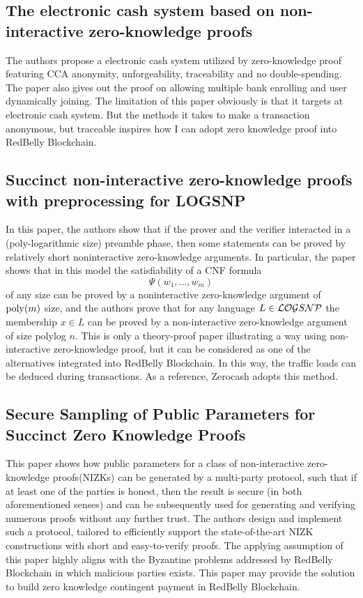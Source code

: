 \subsection{The electronic cash system based on non-interactive zero-knowledge proofs\cite{doi:10.1080/00207160.2014.933816}}

The authors propose a electronic cash system utilized by zero-knowledge proof featuring CCA anonymity, 
unforgeability, traceability and no double-spending. The paper also gives out the proof on allowing multiple
bank enrolling and user dynamically joining. The limitation of this paper obviously is that it targets at 
electronic cash system. But the methods it takes to make a transaction anonymous, but traceable inspires how
I can adopt zero knowledge proof into RedBelly Blockchain.

\subsection{Succinct non-interactive zero-knowledge proofs with preprocessing for LOGSNP\cite{kalai2006succinct}}

In this paper, the authors show that if the prover and the verifier interacted in a (poly-logarithmic size) 
preamble phase, then some statements can be proved by relatively short noninteractive 
zero-knowledge arguments. In particular, the paper shows that in this model the satisfiability of a CNF 
formula $$\Psi(w_{1}, \ldots, w_{m})$$ of any size can be proved by a noninteractive zero-knowledge 
argument of ${\rm poly}(m)$ size, and the authors prove that for any language $L\in {\cal LOG}S{\cal NP}$
the membership $x\in L$ can be proved by a non-interactive zero-knowledge argument of size polylog $n$.
This is only a theory-proof paper illustrating a way using non-interactive zero-knowledge proof, but it can
be considered as one of the alternatives integrated into RedBelly Blockchain. In this way, the traffic loads
can be deduced during transactions. As a reference, Zerocash adopts this method.

\subsection{Secure Sampling of Public Parameters for Succinct Zero Knowledge Proofs\cite{ben2015secure}}

This paper shows how public parameters for a class of non-interactive zero-knowledge proofs(NIZKs)
can be generated by a multi-party protocol, such that if at least one of the parties is honest, 
then the result is secure (in both aforementioned senses) and can be subsequently used for 
generating and verifying numerous proofs without any further trust. The authors design and implement 
such a protocol, tailored to efficiently support the state-of-the-art NIZK constructions with 
short and easy-to-verify proofs. The applying assumption of this paper highly aligns with the Byzantine
problems addressed by RedBelly Blockchain in which malicious parties exists. This paper may provide the 
solution to build zero knowledge contingent payment in RedBelly Blockchain.

